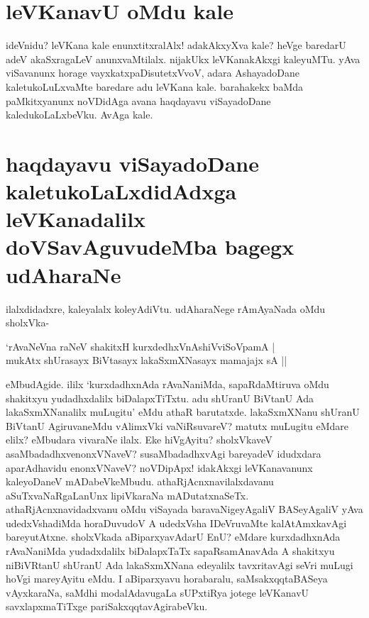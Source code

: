 \section*{leVKanavU oMdu kale}

ideVnidu? leVKana kale enunxtitxralAlx! adakAkxyXva kale? heVge baredarU adeV akaSxragaLeV anunxvaMtilalx. nijakUkx leVKanakAkxgi kaleyuMTu. yAva viSavanunx horage vayxkatxpaDisutetxVvoV, adara AshayadoDane kaletukoLuLxvaMte baredare adu leVKana kale. barahakekx baMda paMkitxyanunx noVDidAga avana haqdayavu viSayadoDane kaledukoLaLxbeVku. AvAga kale.

\section*{haqdayavu viSayadoDane kaletukoLaLxdidAdxga leVKanadalilx doVSavAguvudeMba bagegx udAharaNe}

ilalxdidadxre, kaleyalalx koleyAdiVtu. udAharaNege rAmAyaNada oMdu sholxVka-

\begin{shloka}
`rAvaNeVna raNeV shakitxH kurxdedhxVnAshiVviSoVpamA |\label{120}\\
mukAtx shUrasayx BiVtasayx lakaSxmXNasayx mamajajx sA ||
\end{shloka}
eMbudAgide. ililx `kurxdadhxnAda rAvaNaniMda, sapaRdaMtiruva oMdu shakitxyu yudadhxdalilx biDalapxTiTxtu. adu shUranU BiVtanU Ada lakaSxmXNanalilx muLugitu' eMdu athaR barutatxde. lakaSxmXNanu shUranU BiVtanU AgiruvaneMdu vAlimxVki vaNiRsuvareV? matutx muLugitu eMdare elilx? eMbudara vivaraNe ilalx. Eke hiVgAyitu? sholxVkaveV asaMbadadhxvenonxVNaveV? susaMbadadhxvAgi bareyadeV idudxdara aparAdhavidu enonxVNaveV? noVDipApx! idakAkxgi leVKanavanunx kaleyoDaneV mADabeVkeMbudu. athaRjAcnxnavilalxdavanu aSuTxvaNaRgaLanUnx lipiVkaraNa mADutatxnaSeTx. athaRjAcnxnavidadxvanu oMdu viSayada baravaNigeyAgaliV BASeyAgaliV yAva udedxVshadiMda  horaDuvudoV A udedxVsha IDeVruvaMte kalAtAmxkavAgi bareyutAtxne. sholxVkada aBiparxyavAdarU EnU? eMdare kurxdadhxnAda rAvaNaniMda yudadxdalilx biDalapxTaTx sapaRsamAnavAda A shakitxyu niBiVRtanU shUranU Ada lakaSxmXNana edeyalilx tavxritavAgi seVri muLugi hoVgi mareyAyitu eMdu. I aBiparxyavu horabaralu, saMsakxqqtaBASeya vAyxkaraNa, saMdhi modalAdavugaLa sUPxtiRya jotege leVKanavU savxlapxmaTiTxge pariSakxqqtavAgirabeVku.


